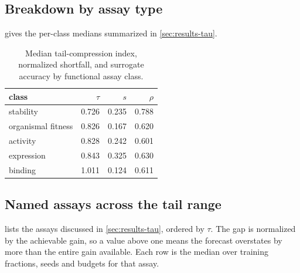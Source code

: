 \documentclass{article}
\theoremstyle{plain}
\theoremstyle{definition}
\begin{document}
\subsection{Breakdown by assay type}
\label{app:class}

 gives the per-class medians summarized in \cref{sec:results-tau}.

\begin{table}[ht]
\caption{Median tail-compression index, normalized shortfall, and surrogate accuracy by
functional assay class.}
\label{tab:class}
\vskip 0.1in
\begin{center}
\begin{small}
\begin{tabular}{lrrr}
\toprule
class & $\tau$ & $s$ & $\rho$ \\
\midrule
stability          & 0.726 & 0.235 & 0.788 \\
organismal fitness & 0.826 & 0.167 & 0.620 \\
activity           & 0.828 & 0.242 & 0.601 \\
expression         & 0.843 & 0.325 & 0.630 \\
binding            & 1.011 & 0.124 & 0.611 \\
\bottomrule
\end{tabular}
\end{small}
\end{center}
\end{table}

\subsection{Named assays across the tail range}
\label{app:named}

 lists the assays discussed in \cref{sec:results-tau}, ordered by
$\tau$. The gap is normalized by the achievable gain, so a value above one means the
forecast overstates by more than the entire gain available. Each row is the median over
training fractions, seeds and budgets for that assay.
\end{document}
